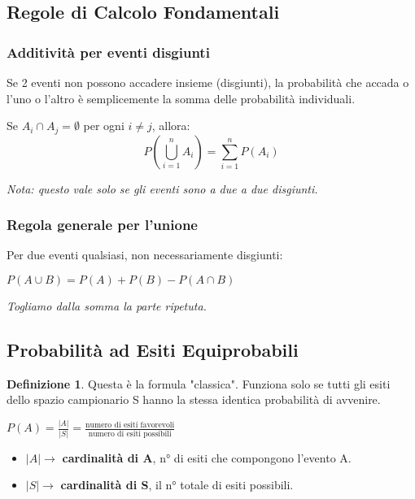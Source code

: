 \documentclass[a4paper, 11pt]{article}
\theoremstyle{definition}
\newtheorem{definizione}{Definizione}[section]
\begin{document}
\newpage

\subsection{Regole di Calcolo Fondamentali}

\subsubsection{Additività per eventi disgiunti}
Se 2 eventi non possono accadere insieme (disgiunti), la probabilità che accada o l'uno o l'altro è semplicemente la somma delle probabilità individuali.
\begin{formulabox}
    Se $A_i \cap A_j = \emptyset$ per ogni $i \neq j$, allora:
    \[ P\left(\bigcup_{i=1}^{n} A_i\right) = \sum_{i=1}^{n} P(A_i) \]
\end{formulabox}
\textit{Nota: questo vale solo se gli eventi sono a due a due disgiunti.}

\subsubsection{Regola generale per l'unione}
Per due eventi qualsiasi, non necessariamente disgiunti:
\begin{formulabox}
    $P(A \cup B) = P(A) + P(B) - P(A \cap B)$
\end{formulabox}
\textit{Togliamo dalla somma la parte ripetuta.}

\subsection{Probabilità ad Esiti Equiprobabili}
\begin{definizione}
Questa è la formula "classica". Funziona solo se tutti gli esiti dello spazio campionario S hanno la stessa identica probabilità di avvenire.
\begin{formulabox}
    $P(A) = \frac{|A|}{|S|} = \frac{\text{numero di esiti favorevoli}}{\text{numero di esiti possibili}}$
\end{formulabox}
\begin{itemize}
    \item $|A| \rightarrow$ \textbf{cardinalità di A}, n° di esiti che compongono l'evento A.
    \item $|S| \rightarrow$ \textbf{cardinalità di S}, il n° totale di esiti possibili.
\end{itemize}
\end{definizione}
\end{document}
